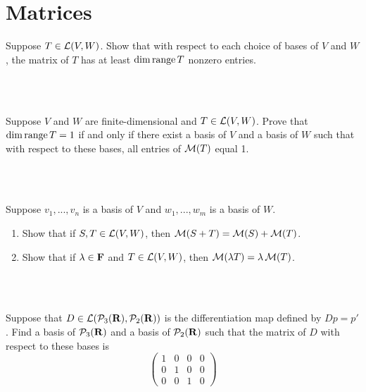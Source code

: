 \section{Matrices}

\begin{exercise}
    Suppose $T \in \mathcal{L}(V,W)$. Show that with respect to each choice of bases of $V$ and $W$, the matrix of $T$ has at least $\dim \operatorname{\text{range}} T$ nonzero entries. \\
\end{exercise}

\begin{solution}
    \\ \td \\
\end{solution}

\begin{exercise}
    Suppose $V$ and $W$ are finite-dimensional and $T \in \mathcal{L}(V,W)$. Prove that $\dim \operatorname{\text{range}} T = 1$ if and only if there exist a basis of $V$ and a basis of $W$ such that with respect to these bases, all entries of $\operatorname{\mathcal{M}}(T)$ equal 1. \\
\end{exercise}

\begin{solution}
    \\ \td \\
\end{solution}

\begin{exercise}
    Suppose $v_1, ..., v_n$ is a basis of $V$ and $w_1, ..., w_m$ is a basis of $W$.
    \begin{enumerate}[label=(\alph*)]
        \item Show that if $S,T \in \mathcal{L}(V,W)$, then $\operatorname{\mathcal{M}}(S+T) = \operatorname{\mathcal{M}}(S) + \operatorname{\mathcal{M}}(T)$.
        \item Show that if $\lambda \in \mathbf{F}$ and $T \in \mathcal{L}(V,W)$, then $\operatorname{\mathcal{M}}(\lambda T) = \lambda \operatorname{\mathcal{M}}(T)$. \\
    \end{enumerate}
\end{exercise}

\begin{solution}
    \\ \td \\
\end{solution}

\begin{exercise}
    Suppose that $D \in \mathcal{L}(\mathcal{P}_3(\mathbf{R}), \mathcal{P}_2(\mathbf{R}))$ is the differentiation map defined by $Dp = p'$. Find a basis of $\mathcal{P}_3(\mathbf{R})$ and a basis of $\mathcal{P}_2(\mathbf{R})$ such that the matrix of $D$ with respect to these bases is
    $$\begin{pmatrix}
        1 & 0 & 0 & 0 \\ 0 & 1 & 0 & 0 \\ 0 & 0 & 1 & 0 
    \end{pmatrix}$$
\end{exercise}

